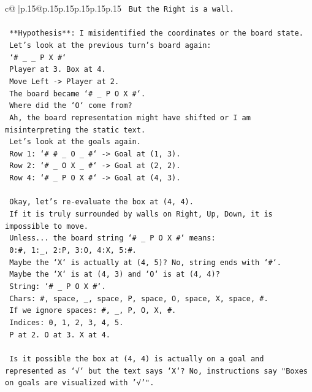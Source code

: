 \documentclass{article}
\begin{document}
{\begin{supertabular}{c@{$\;$}|p{.15\linewidth}@{}p{.15\linewidth}p{.15\linewidth}p{.15\linewidth}p{.15\linewidth}p{.15\linewidth}}
{{{\texttt{     But the Right is a wall.} \\
\\ 
\texttt{     **Hypothesis**: I misidentified the coordinates or the board state.} \\
\texttt{     Let's look at the previous turn's board again:} \\
\texttt{     `\# \_ \_ P X \#`} \\
\texttt{     Player at 3. Box at 4.} \\
\texttt{     Move Left {-}> Player at 2.} \\
\texttt{     The board became `\# \_ P O X \#`.} \\
\texttt{     Where did the `O` come from?} \\
\texttt{     Ah, the board representation might have shifted or I am misinterpreting the static text.} \\
\texttt{     Let's look at the goals again.} \\
\texttt{     Row 1: `\# \# \_ O \_ \#` {-}> Goal at (1, 3).} \\
\texttt{     Row 2: `\# \_ O X \_ \#` {-}> Goal at (2, 2).} \\
\texttt{     Row 4: `\# \_ P O X \#` {-}> Goal at (4, 3).} \\
\\ 
\texttt{     Okay, let's re{-}evaluate the box at (4, 4).} \\
\texttt{     If it is truly surrounded by walls on Right, Up, Down, it is impossible to move.} \\
\texttt{     Unless... the board string `\# \_ P O X \#` means:} \\
\texttt{     0:\#, 1:\_, 2:P, 3:O, 4:X, 5:\#.} \\
\texttt{     Maybe the `X` is actually at (4, 5)? No, string ends with `\#`.} \\
\texttt{     Maybe the `X` is at (4, 3) and `O` is at (4, 4)?} \\
\texttt{     String: `\# \_ P O X \#`.} \\
\texttt{     Chars: \#, space, \_, space, P, space, O, space, X, space, \#.} \\
\texttt{     If we ignore spaces: \#, \_, P, O, X, \#.} \\
\texttt{     Indices: 0, 1, 2, 3, 4, 5.} \\
\texttt{     P at 2. O at 3. X at 4.} \\
\\ 
\texttt{     Is it possible the box at (4, 4) is actually on a goal and represented as `√` but the text says `X`? No, instructions say "Boxes on goals are visualized with '√'".} \\
}}}
\end{supertabular}}
\end{document}

